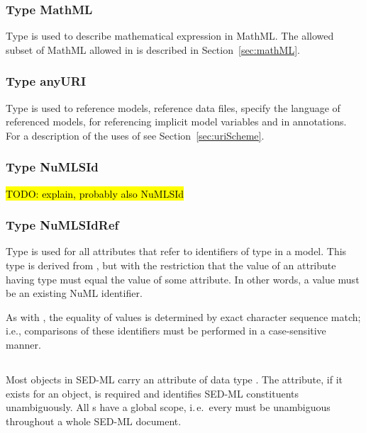 \subsubsection{Type MathML}
\label{type:mathml}
Type  is used to describe mathematical expression in MathML. The allowed subset of MathML allowed in  is described in Section~\ref{sec:mathML}.

\subsubsection{Type anyURI}
\label{type:anyURI}
Type  is used to reference models, reference data files, specify the language of referenced models, for referencing implicit model variables and in annotations. For a description of the uses of  see Section~\ref{sec:uriScheme}.

\subsubsection{Type NuMLSId}
\label{type:numlsid}
\hl{TODO: explain, probably also NuMLSId}

\subsubsection{Type NuMLSIdRef}
\label{type:numlsidref}
Type  is used for all attributes that refer to identifiers of type \hyperref[type:numlsid]{} in a model. This type is derived from \hyperref[type:numlsid]{}, but with the restriction that the value of an attribute having type  must equal the value of some \hyperref[type:numlsid]{} attribute. In other words, a  value must be an existing NuML identifier.

As with \hyperref[type:numlsid]{}, the equality of  values is determined by exact character sequence match; i.e., comparisons of these identifiers must be performed in a case-sensitive manner.


\subsection{}
\label{sec:id}
Most objects in SED-ML carry an  attribute of data type \hyperref[type:sid]{}. The  attribute, if it exists for an object, is required and identifies SED-ML constituents unambiguously. All s have a global scope, i.\,e.\ every  must be unambiguous throughout a whole SED-ML document.

